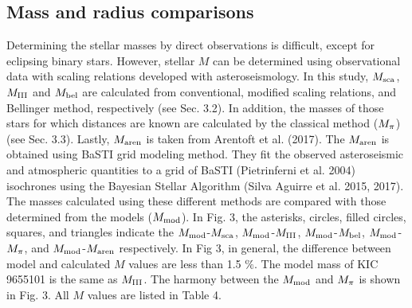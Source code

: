 \documentclass[a4paper,fleqn,usenatbib]{mnras}     %
\begin{document}
{\subsection{Mass and radius comparisons}
Determining the stellar masses by direct observations is difficult, except for eclipsing binary stars. 
However, stellar $M$ can be determined using 
observational data with scaling relations
 developed with asteroseismology.
In this study, $M_{\rm sca}$, $M_{\rm III}$ and $M_{\rm bel}$ are calculated from 
conventional, modified scaling relations, and Bellinger method, respectively (see Sec. 3.2).
In addition, 
the masses of those stars for 
which distances are known are calculated 
by the classical method ($M_{\rm \pi}$) (see Sec. 3.3).
Lastly, $M_{\rm aren}$ is taken from Arentoft et al. (2017).
The $M_{\rm aren}$ is obtained using BaSTI grid modeling method.
They fit the observed asteroseismic and 
atmospheric quantities to a grid of BaSTI (Pietrinferni et al. 2004) isochrones 
using the Bayesian Stellar Algorithm (Silva Aguirre et al. 2015, 2017).  
The masses calculated using these different 
methods are compared with those determined from the models ($M_{\rm mod}$).
In Fig. 3, the asterisks, circles, filled circles, squares, and triangles indicate the $M_{\rm mod}$-$M_{\rm sca}$, $M_{\rm mod}$-$M_{\rm III}$, 
$M_{\rm mod}$-$M_{\rm bel}$,
 $M_{\rm mod}$-$M_{\rm \pi}$,
 and $M_{\rm mod}$-$M_{\rm aren}$  respectively. 
In Fig 3, in general, the difference between model and calculated $M$ values are less than  1.5 $\%$.
The model mass of KIC 9655101 is the same as $M_{\rm III}$.
The harmony between the $M_{\rm mod}$ and $M_{\rm \pi}$ is shown in Fig. 3.
All $M$ values are listed in Table 4.

}
\end{document}
